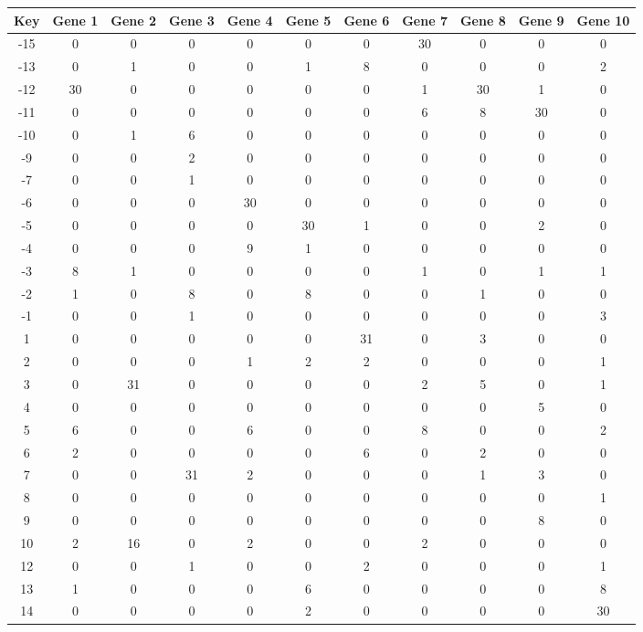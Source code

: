 \begin{tabular}{|c|c|c|c|c|c|c|c|c|c|c|}
\hline
Key & Gene 1 & Gene 2 & Gene 3 & Gene 4 & Gene 5 & Gene 6 & Gene 7 & Gene 8 & Gene 9 & Gene 10 \\
\hline
-15 & 0 & 0 & 0 & 0 & 0 & 0 & 30 & 0 & 0 & 0 \\
-13 & 0 & 1 & 0 & 0 & 1 & 8 & 0 & 0 & 0 & 2 \\
-12 & 30 & 0 & 0 & 0 & 0 & 0 & 1 & 30 & 1 & 0 \\
-11 & 0 & 0 & 0 & 0 & 0 & 0 & 6 & 8 & 30 & 0 \\
-10 & 0 & 1 & 6 & 0 & 0 & 0 & 0 & 0 & 0 & 0 \\
-9 & 0 & 0 & 2 & 0 & 0 & 0 & 0 & 0 & 0 & 0 \\
-7 & 0 & 0 & 1 & 0 & 0 & 0 & 0 & 0 & 0 & 0 \\
-6 & 0 & 0 & 0 & 30 & 0 & 0 & 0 & 0 & 0 & 0 \\
-5 & 0 & 0 & 0 & 0 & 30 & 1 & 0 & 0 & 2 & 0 \\
-4 & 0 & 0 & 0 & 9 & 1 & 0 & 0 & 0 & 0 & 0 \\
-3 & 8 & 1 & 0 & 0 & 0 & 0 & 1 & 0 & 1 & 1 \\
-2 & 1 & 0 & 8 & 0 & 8 & 0 & 0 & 1 & 0 & 0 \\
-1 & 0 & 0 & 1 & 0 & 0 & 0 & 0 & 0 & 0 & 3 \\
1 & 0 & 0 & 0 & 0 & 0 & 31 & 0 & 3 & 0 & 0 \\
2 & 0 & 0 & 0 & 1 & 2 & 2 & 0 & 0 & 0 & 1 \\
3 & 0 & 31 & 0 & 0 & 0 & 0 & 2 & 5 & 0 & 1 \\
4 & 0 & 0 & 0 & 0 & 0 & 0 & 0 & 0 & 5 & 0 \\
5 & 6 & 0 & 0 & 6 & 0 & 0 & 8 & 0 & 0 & 2 \\
6 & 2 & 0 & 0 & 0 & 0 & 6 & 0 & 2 & 0 & 0 \\
7 & 0 & 0 & 31 & 2 & 0 & 0 & 0 & 1 & 3 & 0 \\
8 & 0 & 0 & 0 & 0 & 0 & 0 & 0 & 0 & 0 & 1 \\
9 & 0 & 0 & 0 & 0 & 0 & 0 & 0 & 0 & 8 & 0 \\
10 & 2 & 16 & 0 & 2 & 0 & 0 & 2 & 0 & 0 & 0 \\
12 & 0 & 0 & 1 & 0 & 0 & 2 & 0 & 0 & 0 & 1 \\
13 & 1 & 0 & 0 & 0 & 6 & 0 & 0 & 0 & 0 & 8 \\
14 & 0 & 0 & 0 & 0 & 2 & 0 & 0 & 0 & 0 & 30 \\
\hline
\end{tabular}